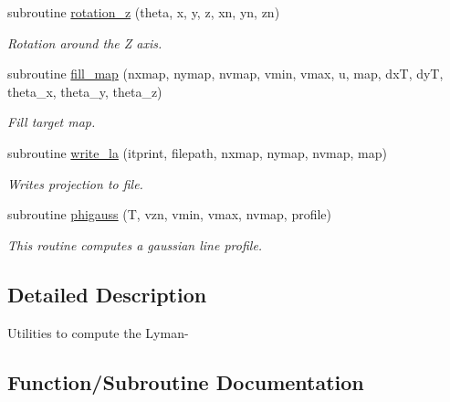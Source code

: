\begin{DoxyCompactItemize}
subroutine \hyperlink{namespacelyman__alpha__utilities_a2c97c4405186edcb70d2e37bbe7306da}{rotation\+\_\+z} (theta, x, y, z, xn, yn, zn)
\begin{DoxyCompactList}\small\item\em Rotation around the Z axis. \end{DoxyCompactList}\item 
subroutine \hyperlink{namespacelyman__alpha__utilities_a7ca5810d29123f1c5c6fd3170f5f5bf3}{fill\+\_\+map} (nxmap, nymap, nvmap, vmin, vmax, u, map, dx\+T, dy\+T, theta\+\_\+x, theta\+\_\+y, theta\+\_\+z)
\begin{DoxyCompactList}\small\item\em Fill target map. \end{DoxyCompactList}\item 
subroutine \hyperlink{namespacelyman__alpha__utilities_afdab7ea06bb95956c43102154651cfd1}{write\+\_\+la} (itprint, filepath, nxmap, nymap, nvmap, map)
\begin{DoxyCompactList}\small\item\em Writes projection to file. \end{DoxyCompactList}\item 
subroutine \hyperlink{namespacelyman__alpha__utilities_a826e6fe44f66513e5a47f2b968e1d0b8}{phigauss} (T, vzn, vmin, vmax, nvmap, profile)
\begin{DoxyCompactList}\small\item\em This routine computes a gaussian line profile. \end{DoxyCompactList}\end{DoxyCompactItemize}


\subsection{Detailed Description}
Utilities to compute the Lyman-\/  

\subsection{Function/\+Subroutine Documentation}
\hypertarget{namespacelyman__alpha__utilities_a7ca5810d29123f1c5c6fd3170f5f5bf3}{}
